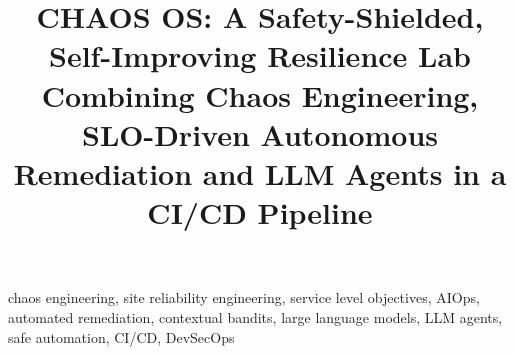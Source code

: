 \documentclass[conference]{IEEEtran}
\begin{document}
\title{CHAOS OS: A Safety-Shielded, Self-Improving Resilience Lab Combining Chaos Engineering,
SLO-Driven Autonomous Remediation and LLM Agents in a CI/CD Pipeline}

\author{
\IEEEauthorblockN{[Author 1], [Author 2], [Author 3], [Author 4]}
}

\maketitle



\begin{IEEEkeywords}
chaos engineering, site reliability engineering, service level objectives, AIOps, automated
remediation, contextual bandits, large language models, LLM agents, safe automation, CI/CD,
DevSecOps
\end{IEEEkeywords}









\balance

\end{document}
